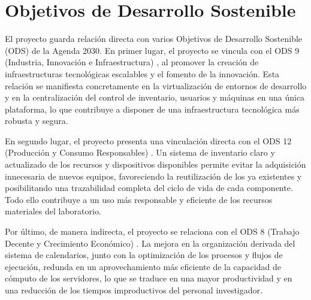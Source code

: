 \section{Objetivos de Desarrollo Sostenible}

El proyecto guarda relación directa con varios Objetivos de Desarrollo Sostenible (ODS) de la Agenda 2030. \cite{pacto_mundial_ods_accion}
En primer lugar, el proyecto se vincula con el ODS 9 (Industria, Innovación e Infraestructura) \cite{pacto_mundial_ods9}, al promover la creación de infraestructuras tecnológicas escalables y el fomento de la innovación. Esta relación se manifiesta concretamente en la virtualización de entornos de desarrollo y en la centralización del control de inventario, usuarios y máquinas en una única plataforma, lo que contribuye a disponer de una infraestructura tecnológica más robusta y segura.

En segundo lugar, el proyecto presenta una vinculación directa con el ODS 12 (Producción y Consumo Responsables) \cite{pacto_mundial_ods12}. Un sistema de inventario claro y actualizado de los recursos y dispositivos disponibles permite evitar la adquisición innecesaria de nuevos equipos, favoreciendo la reutilización de los ya existentes y posibilitando una trazabilidad completa del ciclo de vida de cada componente. Todo ello contribuye a un uso más responsable y eficiente de los recursos materiales del laboratorio.


Por último, de manera indirecta, el proyecto se relaciona con el ODS 8 (Trabajo Decente y Crecimiento Económico) \cite{pacto_mundial_ods8}. La mejora en la organización derivada del sistema de calendarios, junto con la optimización de los procesos y flujos de ejecución, redunda en un aprovechamiento más eficiente de la capacidad de cómputo de los servidores, lo que se traduce en una mayor productividad y en una reducción de los tiempos improductivos del personal investigador.
